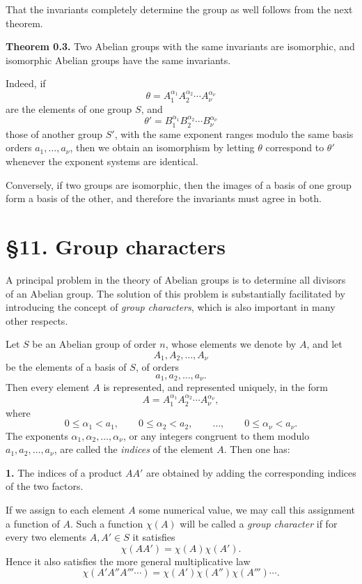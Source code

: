 \documentclass[11pt,a4paper]{book}
\begin{document}
That the invariants completely determine the group as well follows from the next theorem.

\medskip
\noindent\textbf{Theorem 0.3.}
Two Abelian groups with the same invariants are isomorphic, and isomorphic Abelian groups have the same invariants.

\medskip
Indeed, if
\[
\theta=A_1^{\alpha_1}A_2^{\alpha_2}\cdots A_\nu^{\alpha_\nu}
\]
are the elements of one group \(S\), and
\[
\theta'=B_1^{\alpha_1}B_2^{\alpha_2}\cdots B_\nu^{\alpha_\nu}
\]
those of another group \(S'\), with the same exponent ranges modulo the same basis orders \(a_1,\dots,a_\nu\), then we obtain an isomorphism by letting \(\theta\) correspond to \(\theta'\) whenever the exponent systems are identical.

Conversely, if two groups are isomorphic, then the images of a basis of one group form a basis of the other, and therefore the invariants must agree in both.

\section*{\S 11. Group characters}

A principal problem in the theory of Abelian groups is to determine all divisors of an Abelian group. The solution of this problem is substantially facilitated by introducing the concept of \emph{group characters}, which is also important in many other respects.

Let \(S\) be an Abelian group of order \(n\), whose elements we denote by \(A\), and let
\[
A_1,A_2,\dots,A_\nu
\tag{1}
\]
be the elements of a basis of \(S\), of orders
\[
a_1,a_2,\dots,a_\nu.
\]
Then every element \(A\) is represented, and represented uniquely, in the form
\[
A = A_1^{\alpha_1}A_2^{\alpha_2}\cdots A_\nu^{\alpha_\nu},
\tag{2}
\]
where
\[
0\le \alpha_1<a_1,\qquad 0\le \alpha_2<a_2,\qquad \dots,\qquad 0\le \alpha_\nu<a_\nu.
\tag{3}
\]
The exponents \(\alpha_1,\alpha_2,\dots,\alpha_\nu\), or any integers congruent to them modulo \(a_1,a_2,\dots,a_\nu\), are called the \emph{indices} of the element \(A\). Then one has:

\medskip
\noindent\textbf{1.} The indices of a product \(AA'\) are obtained by adding the corresponding indices of the two factors.

\medskip
If we assign to each element \(A\) some numerical value, we may call this assignment a function of \(A\). Such a function \(\chi(A)\) will be called a \emph{group character} if for every two elements \(A,A'\in S\) it satisfies
\[
\chi(AA')=\chi(A)\chi(A').
\tag{4}
\]
Hence it also satisfies the more general multiplicative law
\[
\chi(A'A''A'''\cdots)=\chi(A')\chi(A'')\chi(A''')\cdots.
\]
\end{document}
